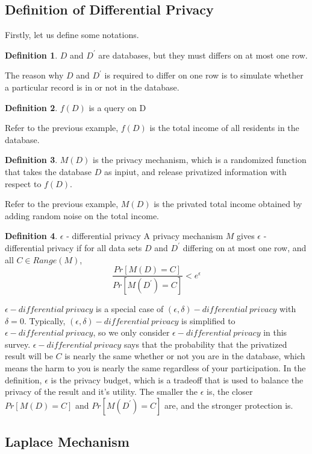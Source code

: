 \documentclass[a4paper, 11pt]{article} %
\theoremstyle{definition}
\newtheorem{definition}{Definition}[section]
\begin{document}
\subsection{Definition of Differential Privacy}
Firstly, let us define some notations.
\theoremstyle{definition}
\begin{definition}{}
 $D$ and $D^\prime$ are databases, but they must differs on at most one row. 
\end{definition}
The reason why $D$ and $D^\prime$ is required to differ on one row is to simulate whether a particular record is in or not in the database.
\begin{definition}{}
$f(D)$ is a query on D
\end{definition}
Refer to the previous example, $f(D)$ is the total income of all residents in the database.
\begin{definition}{}
	$M(D)$ is the privacy mechanism, which is a randomized function that takes the database $D$ as inpiut, and release privatized information with respect to $f(D)$.
\end{definition}
Refer to the previous example, $M(D)$ is the privated total income obtained by adding random noise on the total income.
\begin{definition}{$\epsilon$ - differential privacy}
	A privacy mechanism $M$ gives $\epsilon$ - differential privacy if for all data sets $D$ and $D^\prime$ differing on at most one row, and all $C\in Range(M)$,
	\[  \frac{Pr[M(D) = C]}{Pr[M(D^\prime) = C]}< e^\epsilon \]
\end{definition}
$\epsilon - differential \ privacy$ is a special case of $(\epsilon,\delta) - differential \ privacy$\cite{dwork2011differential,dwork2006our} with $\delta = 0$. Typically, $(\epsilon,\delta) - differential \ privacy$ is simplified to $\epsilon - differential \ privacy$, so we only consider $\epsilon - differential \ privacy$ in this survey. $\epsilon - differential \ privacy$ says that the probability that the privatized result will be $C$ is nearly the same whether or not you are in the database, which means the harm to you is nearly the same regardless of your participation. In the definition, $\epsilon$ is the privacy budget, which is a tradeoff that is used to balance the privacy of the result and it's utility. The smaller the $\epsilon$ is, the closer $Pr[M(D) = C]$ and $Pr[M(D^\prime) = C]$ are, and the stronger protection is. 
\subsection{Laplace Mechanism}
\end{document}
